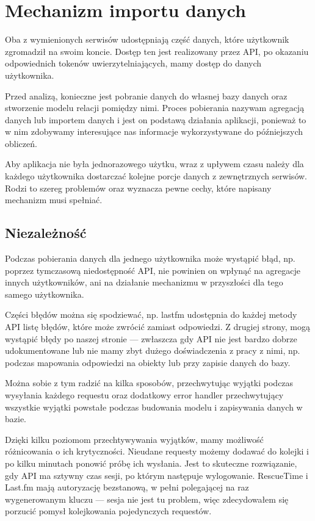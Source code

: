 \documentclass[brudnopis]{xmgr}
\begin{document}
    \section{Mechanizm importu danych}
        Oba z wymienionych serwisów udostępniają część danych, które użytkownik zgromadził na swoim koncie.
        Dostęp ten jest realizowany przez API, po okazaniu odpowiednich tokenów uwierzytelniających, mamy dostęp do danych użytkownika.

        Przed analizą, konieczne jest pobranie danych do własnej bazy danych oraz stworzenie modelu relacji pomiędzy nimi.
        Proces pobierania nazywam agregacją danych lub importem danych i jest on podstawą działania aplikacji,
        ponieważ to w nim zdobywamy interesujące nas informacje wykorzystywane do późniejszych obliczeń.

        Aby aplikacja nie była jednorazowego użytku, wraz z upływem czasu należy dla każdego użytkownika dostarczać
        kolejne porcje danych z zewnętrznych serwisów.
        Rodzi to szereg problemów oraz wyznacza pewne cechy, które napisany mechanizm musi spełniać.

        \subsection*{Niezależność}
            Podczas pobierania danych dla jednego użytkownika może wystąpić błąd, np. poprzez tymczasową niedostępność API,
            nie powinien on wpłynąć na agregacje innych użytkowników, ani na działanie mechanizmu w przyszłości dla tego samego użytkownika.

            Części błędów można się spodziewać, np. lastfm udostępnia do każdej metody API listę błędów, które może zwrócić zamiast odpowiedzi.
            Z drugiej strony, mogą wystąpić błędy po naszej stronie --- zwłaszcza gdy API nie jest bardzo dobrze udokumentowane
            lub nie mamy zbyt dużego doświadczenia z pracy z nimi, np. podczas mapowania odpowiedzi na obiekty lub przy zapisie danych do bazy.

            Można sobie z tym radzić na kilka sposobów, przechwytując wyjątki podczas wysyłania każdego requestu
            oraz dodatkowy error handler przechwytujący wszystkie wyjątki powstałe podczas budowania modelu i zapisywania danych w bazie.

            Dzięki kilku poziomom przechtywywania wyjątków, mamy możliwość różnicowania o ich krytyczności.
            Nieudane requesty możemy dodawać do kolejki i po kilku minutach ponowić próbę ich wysłania.
            Jest to skuteczne rozwiązanie, gdy API ma sztywny czas sesji, po którym następuje wylogowanie.
            RescueTime i Last.fm mają autoryzację bezstanową,
            w pełni polegającej na raz wygenerowanym kluczu --- sesja nie jest tu problem,
            więc zdecydowałem się porzucić pomysł kolejkowania pojedynczych requestów.
\end{document}
